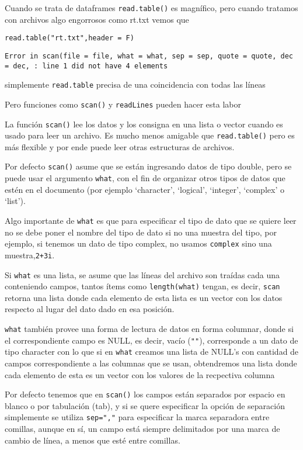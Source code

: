 \documentclass[]{article}
\begin{document}
Cuando se trata de dataframes \texttt{read.table()} es magnífico, pero
cuando tratamos con archivos algo engorrosos como rt.txt vemos que

\begin{verbatim}
read.table("rt.txt",header = F)
\end{verbatim}

\begin{verbatim}
Error in scan(file = file, what = what, sep = sep, quote = quote, dec = dec, : line 1 did not have 4 elements
\end{verbatim}

simplemente \texttt{read.table} precisa de una coincidencia con todas
las líneas

Pero funciones como \texttt{scan()} y \texttt{readLines} pueden hacer
esta labor

La función \texttt{scan()} lee los datos y los consigna en una lista o
vector cuando es usado para leer un archivo. Es mucho menos amigable que
\texttt{read.table()} pero es más flexible y por ende puede leer otras
estructuras de archivos.

Por defecto \texttt{scan()} asume que se están ingresando datos de tipo
double, pero se puede usar el argumento \texttt{what}, con el fin de
organizar otros tipos de datos que estén en el documento (por ejemplo
`character', `logical', `integer', `complex' o `list').

Algo importante de \texttt{what} es que para especificar el tipo de dato
que se quiere leer no se debe poner el nombre del tipo de dato si no una
muestra del tipo, por ejemplo, si tenemos un dato de tipo complex, no
usamos \texttt{complex} sino una muestra,\texttt{2+3i}.

Si \texttt{what} es una lista, se asume que las líneas del archivo son
traídas cada una conteniendo campos, tantos ítems como
\texttt{length(what)} tengan, es decir, \texttt{scan} retorna una lista
donde cada elemento de esta lista es un vector con los datos respecto al
lugar del dato dado en esa posición.

\texttt{what} también provee una forma de lectura de datos en forma
columnar, donde si el correspondiente campo es NULL, es decir, vacío
(\texttt{""}), corresponde a un dato de tipo character con lo que si en
\texttt{what} creamos una lista de NULL's con cantidad de campos
correspondiente a las columnas que se usan, obtendremos una lista donde
cada elemento de esta es un vector con los valores de la recpectiva
columna

Por defecto tenemos que en \texttt{scan()} los campos están separados
por espacio en blanco o por tabulación (tab), y si se quere especificar
la opción de separación simplemente se utiliza \texttt{sep=","} para
especificar la marca separadora entre comillas, aunque en sí, un campo
está siempre delimitados por una marca de cambio de línea, a menos que
esté entre comillas.
\end{document}
